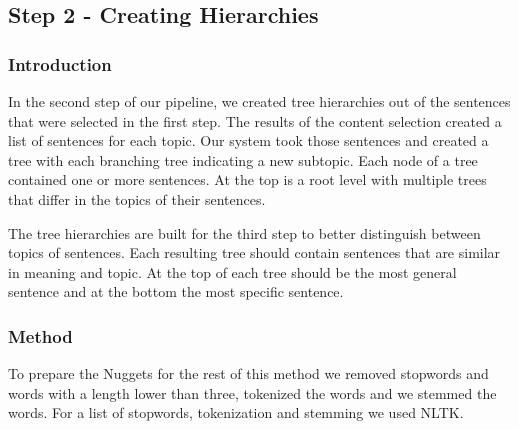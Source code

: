 



\subsection{Step 2 - Creating Hierarchies}

\subsubsection{Introduction}

In the second step of our pipeline, we created tree hierarchies out of the sentences that were selected in the first step. The results of the content selection created a list of sentences for each topic. Our system took those sentences and created a tree with each branching tree indicating a new subtopic. Each node of a tree contained one or more sentences. At the top is a root level with multiple trees that differ in the topics of their sentences. 

The tree hierarchies are built for the third step to better distinguish between topics of sentences. Each resulting tree should contain sentences that are similar in meaning and topic. At the top of each tree should be the most general sentence and at the bottom the most specific sentence.


\subsubsection{Method}

To prepare the Nuggets for the rest of this method we removed stopwords and words with a length lower than three, tokenized the words and we stemmed the words. For a list of stopwords, tokenization and stemming we used NLTK.

